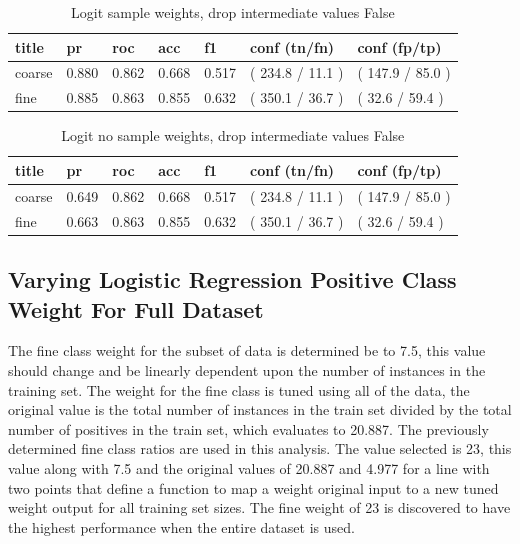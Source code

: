 \documentclass[ms]{nuthesis}
\begin{document}
\FloatBarrier
\begin{table}[h]
\centering
\caption{Logit sample weights, drop intermediate values False}
\label{tab:LogReg-DropFalse}
\begin{tabular}{|l||l||l||l||l||l||l|}\toprule
title & pr & roc & acc & f1 & conf (tn/fn) & conf (fp/tp) \\ \midrule
coarse & 0.880 & 0.862 & 0.668 & 0.517 & ( 234.8 / 11.1 ) & ( 147.9 / 85.0 ) \\
fine & 0.885 & 0.863 & 0.855 & 0.632 & ( 350.1 / 36.7 ) & ( 32.6 / 59.4 ) \\ \bottomrule
\end{tabular}
\end{table}
\FloatBarrier

\FloatBarrier
\begin{table}[h]
\centering
\caption{Logit no sample weights, drop intermediate values False}
\label{tab:LogReg-NoSW-DropFalse}
\begin{tabular}{|l||l||l||l||l||l||l|}\toprule
title & pr & roc & acc & f1 & conf (tn/fn) & conf (fp/tp) \\ \midrule
coarse & 0.649 & 0.862 & 0.668 & 0.517 & ( 234.8 / 11.1 ) & ( 147.9 / 85.0 ) \\
fine & 0.663 & 0.863 & 0.855 & 0.632 & ( 350.1 / 36.7 ) & ( 32.6 / 59.4 ) \\ \bottomrule
\end{tabular}
\end{table}
\FloatBarrier


\subsection{Varying Logistic Regression Positive Class Weight For Full Dataset}
\par The fine class weight for the subset of data is determined be to 7.5, this value
should change and be linearly dependent upon the number of instances in the training set.
The weight for the fine class is tuned using all of the data, the original value is the total number
of instances in the train set divided by the total number of positives in the train set, which evaluates
to 20.887. The previously determined fine class ratios are used in this analysis. The value selected is
23, this value along with 7.5 and the original values of 20.887 and 4.977 for a line with two points that
define a function to map a weight original input to a new tuned weight output for all training set sizes.
The fine weight of 23 is discovered to have the highest performance when the entire dataset is used.
\end{document}
